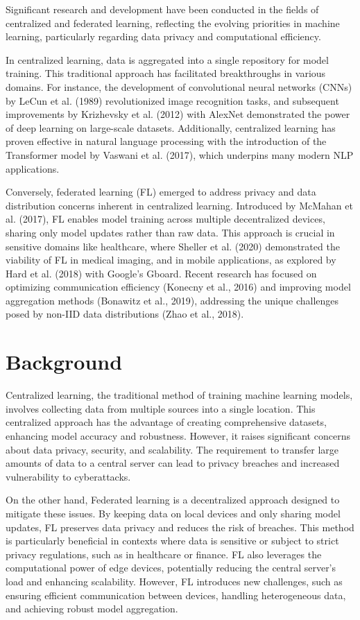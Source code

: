 \documentclass[11pt]{article}
\begin{document}
Significant research and development have been conducted in the fields of centralized and federated learning, reflecting the evolving priorities in machine learning, particularly regarding data privacy and computational efficiency.

In centralized learning, data is aggregated into a single repository for model training. This traditional approach has facilitated breakthroughs in various domains. For instance, the development of convolutional neural networks (CNNs) by LeCun et al. (1989) revolutionized image recognition tasks, and subsequent improvements by Krizhevsky et al. (2012) with AlexNet demonstrated the power of deep learning on large-scale datasets. Additionally, centralized learning has proven effective in natural language processing with the introduction of the Transformer model by Vaswani et al. (2017), which underpins many modern NLP applications.

Conversely, federated learning (FL) emerged to address privacy and data distribution concerns inherent in centralized learning. Introduced by McMahan et al. (2017), FL enables model training across multiple decentralized devices, sharing only model updates rather than raw data. This approach is crucial in sensitive domains like healthcare, where Sheller et al. (2020) demonstrated the viability of FL in medical imaging, and in mobile applications, as explored by Hard et al. (2018) with Google's Gboard. Recent research has focused on optimizing communication efficiency (Konecny et al., 2016) and improving model aggregation methods (Bonawitz et al., 2019), addressing the unique challenges posed by non-IID data distributions (Zhao et al., 2018).


\section{Background}

Centralized learning, the traditional method of training machine learning models, involves collecting data from multiple sources into a single location. This centralized approach has the advantage of creating comprehensive datasets, enhancing model accuracy and robustness. However, it raises significant concerns about data privacy, security, and scalability. The requirement to transfer large amounts of data to a central server can lead to privacy breaches and increased vulnerability to cyberattacks.

On the other hand, Federated learning is a decentralized approach designed to mitigate these issues. By keeping data on local devices and only sharing model updates, FL preserves data privacy and reduces the risk of breaches. This method is particularly beneficial in contexts where data is sensitive or subject to strict privacy regulations, such as in healthcare or finance. FL also leverages the computational power of edge devices, potentially reducing the central server's load and enhancing scalability. However, FL introduces new challenges, such as ensuring efficient communication between devices, handling heterogeneous data, and achieving robust model aggregation.
\end{document}
